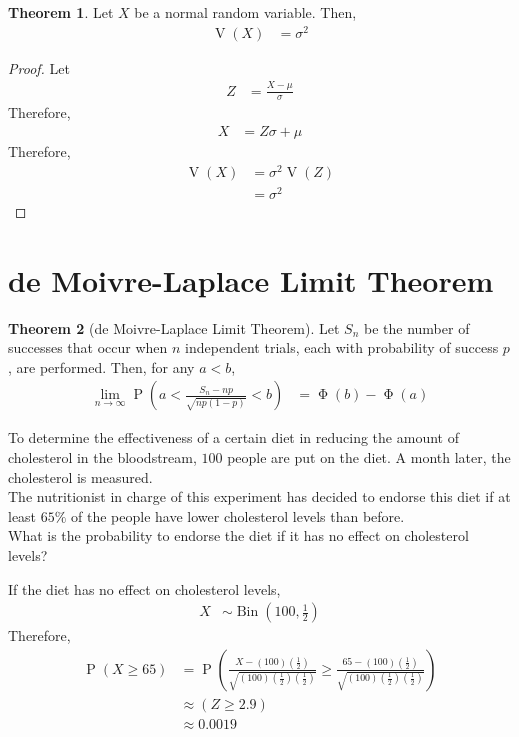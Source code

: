 \documentclass[titlepage, fleqn, a4paper, 12pt, twoside]{article}
\theoremstyle{definition}
\theoremstyle{theorem}
\newtheorem{theorem}{Theorem}
\DeclareMathOperator{\prob}{\mathrm{P}}
\DeclareMathOperator{\var}{\mathrm{V}}
\DeclareMathOperator{\stdnormalcdf}{\mathrm{\Phi}}
\DeclareMathOperator{\bin}{\mathrm{Bin}}
\begin{document}
\begin{theorem}
	Let $X$ be a normal random variable.
	Then,
	\begin{align*}
		\var(X) &= \sigma^2
	\end{align*}
\end{theorem}

\begin{proof}
	Let
	\begin{align*}
		Z &= \frac{X - \mu}{\sigma}
	\end{align*}
	Therefore,
	\begin{align*}
		X &= Z \sigma + \mu
	\end{align*}
	Therefore,
	\begin{align*}
		\var(X) &= \sigma^2 \var(Z)\\
		&= \sigma^2
	\end{align*}
\end{proof}

\section{de Moivre-Laplace Limit Theorem}

\begin{theorem}[de Moivre-Laplace Limit Theorem]
	Let $S_n$ be the number of successes that occur when $n$ independent trials, each with probability of success $p$, are performed.
	Then, for any $a < b$,
	\begin{align*}
		\lim\limits_{n \to \infty} \prob\left( a < \frac{S_n - n p}{\sqrt{n p (1 - p)}} < b \right) &= \stdnormalcdf(b) - \stdnormalcdf(a)
	\end{align*}
\end{theorem}

\begin{question}
	To determine the effectiveness of a certain diet in reducing the amount of cholesterol in the bloodstream, $100$ people are put on the diet.
	A month later, the cholesterol is measured.\\
	The nutritionist in charge of this experiment has decided to endorse this diet if at least $65\%$ of the people have lower cholesterol levels than before.\\
	What is the probability to endorse the diet if it has no effect on cholesterol levels?
\end{question}

\begin{solution}
	If the diet has no effect on cholesterol levels,
	\begin{align*}
		X &\sim \bin\left( 100,\frac{1}{2} \right)
	\end{align*}
	Therefore,
	\begin{align*}
		\prob(X \ge 65) &= \prob\left( \frac{X - (100) \left( \frac{1}{2} \right)}{\sqrt{(100) \left( \frac{1}{2} \right) \left( \frac{1}{2} \right)}} \ge \frac{65 - (100) \left( \frac{1}{2} \right)}{\sqrt{(100) \left( \frac{1}{2} \right) \left( \frac{1}{2} \right)}} \right)\\
		&\approx (Z \ge 2.9)\\
		&\approx 0.0019
	\end{align*}
\end{solution}
\end{document}
